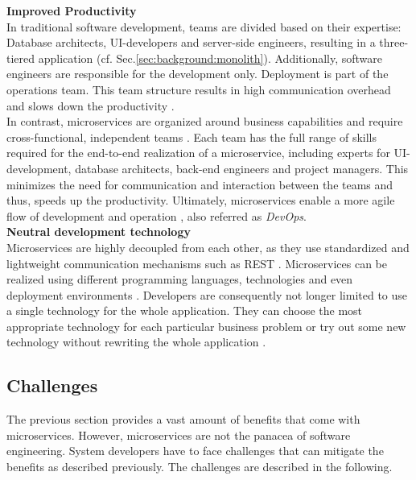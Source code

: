 \noindent
\textbf{Improved Productivity} \\
In traditional software development, teams are divided based on their expertise: Database architects, UI-developers and server-side engineers, resulting in a three-tiered application (cf. Sec.\ref{sec:background:monolith}). Additionally, software engineers are responsible for the development only. Deployment is part of the operations team. This team structure results in high communication overhead and slows down the productivity \cite{Mazlami}. \\
In contrast, microservices are organized around business capabilities and require cross-functional, independent teams \cite{ObjectAwareAmiri}. Each team has the full range of skills required for the end-to-end realization of a microservice, including experts for UI-development, database architects, back-end engineers and project managers. 
This minimizes the need for communication and interaction between the teams and thus, speeds up the productivity. Ultimately, microservices enable a more agile flow of development and operation \cite{ClassificationOfRefactoring}, also referred as \textit{DevOps}. 
\\


\noindent
\textbf{Neutral development technology} \\
Microservices are highly decoupled from each other, as they use standardized and lightweight communication mechanisms such as REST \cite{FunctionalDecompositionHeinrich}. Microservices can be realized using different programming languages, technologies and even deployment environments \cite{DataflowDrivenChen}. Developers are consequently not longer limited to use a single technology for the whole application. They can choose the most appropriate technology for each particular business problem or try out some new technology without rewriting the whole application \cite{ServiceCutter} \cite{TowardsTechnique}. 
 



\subsection{Challenges}
The previous section provides a vast amount of benefits that come with microservices. However, microservices are not the panacea of software engineering. System developers have to face challenges that can mitigate the benefits as described previously. The challenges are described in the following. \\ 


